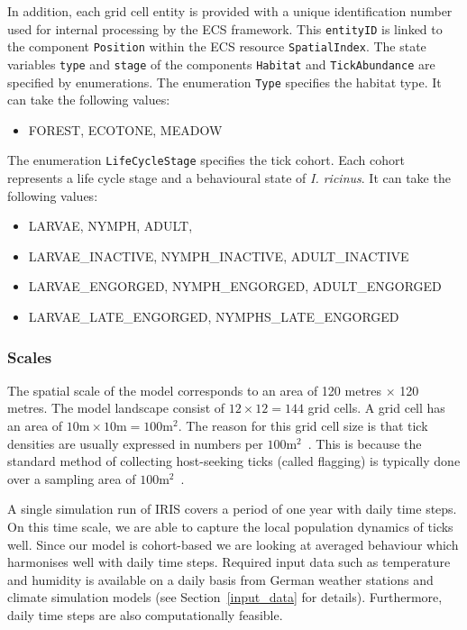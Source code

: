 \documentclass[a4paper, 11pt]{scrartcl}
\newcommand{\inlinecode}[1]{\texttt{\small #1}}
\begin{document}
In addition, each grid cell entity is provided with a unique identification number used for internal processing by the ECS framework. This \inlinecode{entityID} is linked to the component \inlinecode{Position} within the ECS resource \inlinecode{SpatialIndex}. The state variables \inlinecode{type} and \inlinecode{stage} of the components \inlinecode{Habitat} and \inlinecode{TickAbundance} are specified by enumerations. The enumeration \inlinecode{Type} specifies the habitat type. It can take the following values:
\begin{small}
\begin{itemize}[noitemsep]
	\item FOREST, ECOTONE, MEADOW
\end{itemize}
\end{small}

The enumeration \inlinecode{LifeCycleStage} specifies the tick cohort. Each cohort represents a life cycle stage and a behavioural state of \emph{I. ricinus}. It can take the following values:
\begin{small}
\begin{itemize}[noitemsep]
	\item LARVAE, NYMPH, ADULT,  
	\item LARVAE\_INACTIVE, NYMPH\_INACTIVE, ADULT\_INACTIVE
	\item LARVAE\_ENGORGED, NYMPH\_ENGORGED, ADULT\_ENGORGED
	\item LARVAE\_LATE\_ENGORGED, NYMPHS\_LATE\_ENGORGED
\end{itemize}
\end{small}


\subsubsection{Scales}
The spatial scale of the model corresponds to an area of 120 metres $\times$ 120 metres. The model landscape consist of $12 \times 12 = 144$ grid cells. A grid cell has an area of $10 \mathrm{m} \times 10 \mathrm{m} = 100 \mathrm{m}^{2}$. The reason for this grid cell size is that tick densities are usually expressed in numbers per $100 \mathrm{m}^{2}$~\parencite[see e.g.][Table 2]{Boehnke.2015}. This is because the standard method of collecting host-seeking ticks (called flagging) is typically done over a sampling area of $100 \mathrm{m}^{2}$~\parencite{Brugger.2016, Schulz.2014}.

A single simulation run of IRIS covers a period of one year with daily time steps. On this time scale, we are able to capture the local population dynamics of ticks well. Since our model is cohort-based we are looking at averaged behaviour which harmonises well with daily time steps. Required input data such as temperature and humidity is available on a daily basis from German weather stations and climate simulation models (see Section~\ref{input_data} for details). Furthermore, daily time steps are also computationally feasible.
\end{document}
